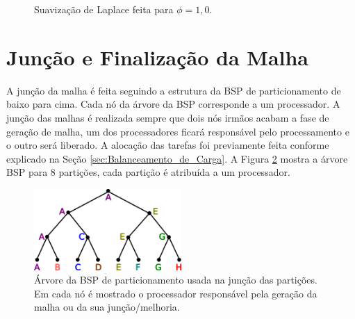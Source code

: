 \begin{figure}[!ht]
{	}
	\qquad	
	\caption{Suavização de Laplace feita para $\phi=1,0$.}
	\label{fig:laplace}
\end{figure}


\section{Junção e Finalização da Malha}

A junção da malha é feita seguindo a estrutura da BSP de particionamento de baixo para cima. Cada nó da árvore da BSP corresponde a um processador. A junção das malhas é realizada sempre que dois nós irmãos acabam a fase de geração de malha, um dos processadores ficará responsável pelo processamento e o outro será liberado. A alocação das tarefas foi previamente feita conforme explicado na Seção \ref{sec:Balanceamento_de_Carga}. A Figura \ref{fig:arvore_juncao} mostra a árvore BSP para 8 partições, cada partição é atribuída a um processador.

\begin{figure}[!ht]
	\centering
	\includegraphics[width=0.5\textwidth]{fig/arvore.png}
	\caption{Árvore da BSP de particionamento usada na junção das partições. Em cada nó é mostrado o processador responsável pela geração da malha ou da sua junção/melhoria.}
	\label{fig:arvore_juncao}
\end{figure}


